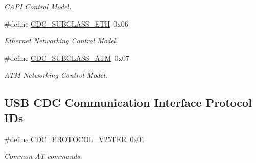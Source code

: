 \begin{DoxyCompactItemize}
\begin{DoxyCompactList}\small\item\em C\-A\-P\-I Control Model. \end{DoxyCompactList}\item 
\hypertarget{group__cdc__protocol__group_gaa5ab06b184069e6a8692c6e82b2595b3}{\#define \hyperlink{group__cdc__protocol__group_gaa5ab06b184069e6a8692c6e82b2595b3}{C\-D\-C\-\_\-\-S\-U\-B\-C\-L\-A\-S\-S\-\_\-\-E\-T\-H}~0x06}\label{group__cdc__protocol__group_gaa5ab06b184069e6a8692c6e82b2595b3}

\begin{DoxyCompactList}\small\item\em Ethernet Networking Control Model. \end{DoxyCompactList}\item 
\hypertarget{group__cdc__protocol__group_gaf1a7d3d1e1dd78003500d6fccd205461}{\#define \hyperlink{group__cdc__protocol__group_gaf1a7d3d1e1dd78003500d6fccd205461}{C\-D\-C\-\_\-\-S\-U\-B\-C\-L\-A\-S\-S\-\_\-\-A\-T\-M}~0x07}\label{group__cdc__protocol__group_gaf1a7d3d1e1dd78003500d6fccd205461}

\begin{DoxyCompactList}\small\item\em A\-T\-M Networking Control Model. \end{DoxyCompactList}\end{DoxyCompactItemize}
\subsection*{U\-S\-B C\-D\-C Communication Interface Protocol I\-Ds}
\begin{DoxyCompactItemize}
\item 
\hypertarget{group__cdc__protocol__group_ga987e4a1ebce34edcea106094d6241032}{\#define \hyperlink{group__cdc__protocol__group_ga987e4a1ebce34edcea106094d6241032}{C\-D\-C\-\_\-\-P\-R\-O\-T\-O\-C\-O\-L\-\_\-\-V25\-T\-E\-R}~0x01}\label{group__cdc__protocol__group_ga987e4a1ebce34edcea106094d6241032}

\begin{DoxyCompactList}\small\item\em Common A\-T commands. \end{DoxyCompactList}\end{DoxyCompactItemize}

